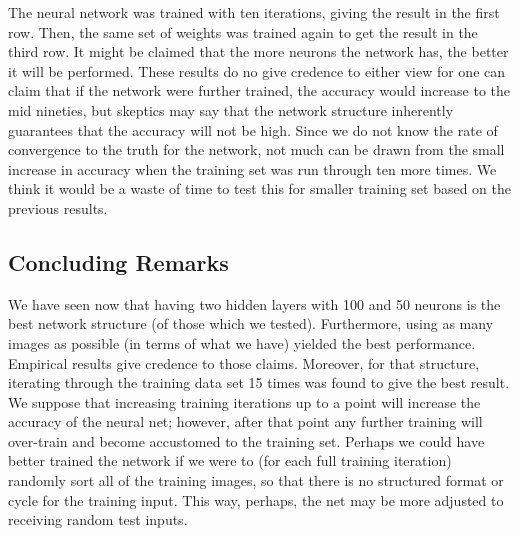\documentclass[12pt]{article}
\begin{document}
The neural network was trained with ten iterations, giving the result in the first row.
Then, the same set of weights was trained again to get the result in the third row.
It might be claimed that the more neurons the network has, the better it will be performed.
These results do no give credence to either view for one can claim that if the network were further trained, the accuracy would increase to the mid nineties, but skeptics may say that the network structure inherently guarantees that the accuracy will not be high.
Since we do not know the rate of convergence to the truth for the network, not much can be drawn from the small increase in accuracy when the training set was run through ten more times.  
We think it would be a waste of time to test this for smaller training set based on the previous results.

\subsection*{Concluding Remarks}

We have seen now that having two hidden layers with 100 and 50 neurons is the best network structure (of those which we tested).
Furthermore, using as many images as possible (in terms of what we have) yielded the best performance.
Empirical results give credence to those claims.
Moreover, for that structure, iterating through the training data set 15 times was found to give the best result. We suppose that increasing training iterations up to a point will increase the accuracy of the neural net; however, after that point any further training will over-train and become accustomed to the training set. Perhaps we could have better trained the network if we were to (for each full training iteration) randomly sort all of the training images, so that there is no structured format or cycle for the training input. This way, perhaps, the net may be more adjusted to receiving random test inputs.
\end{document}
